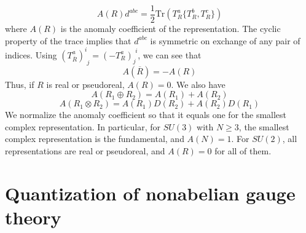 \documentclass[cyan]{elegantnote}
\begin{document}
\[A(R)d^{abc} = \frac{1}{2} \mathrm{Tr}(T^a_R\{T^b_R,T^c_R\})\]
where $A(R)$ is the anomaly coefficient of the representation. The cyclic property of the trace implies that $d^{abc}$ is symmetric on exchange of any pair of indices. Using $(T^{a}_{\overline{R}})^{i}_{\phantom{i}j} = (-T^{a}_R)_{j}^{\phantom{i}i}$, we can see that
\[A(\overline{R}) = -A(R)\]
Thus, if $R$ is real or pseudoreal, $A(R) = 0$. We also have
\[A(R_1\oplus R_2) = A(R_1) + A(R_2)\]
\[A(R_1\otimes R_2) = A(R_1)D(R_2) + A(R_2)D(R_1)\]
We normalize the anomaly coefficient so that it equals one for the smallest complex representation. In particular, for $SU(3)$ with $N \geq 3$, the smallest complex representation is the fundamental, and $A(N) = 1$. For $SU(2)$, all representations are real or pseudoreal, and $A(R) = 0$ for all of them.

\section{Quantization of nonabelian gauge theory}
\end{document}
